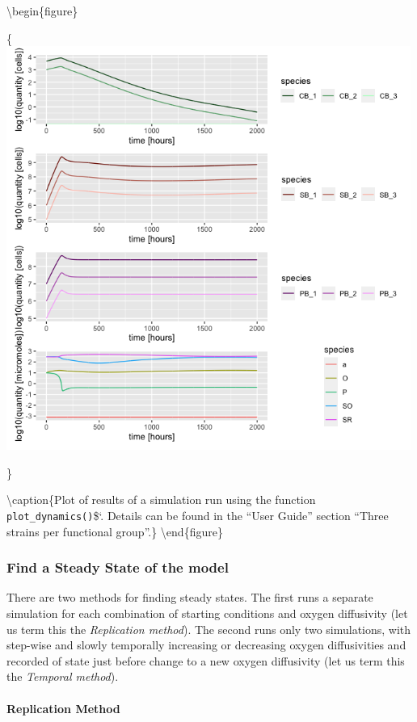 \documentclass[
]{article}
\begin{document}
\textbackslash begin\{figure\}

\{\centering \includegraphics[width=500px]{figures/fig1_plot_dynamics}

\}

\textbackslash caption\{Plot of results of a simulation run using the function \texttt{plot\_dynamics()}\$`. Details can be found in the ``User Guide'' section ``Three strains per functional group''.\}\label{fig:plot-dynamics}
\textbackslash end\{figure\}

\hypertarget{find-a-steady-state-of-the-model}{%
\subsubsection{Find a Steady State of the model}\label{find-a-steady-state-of-the-model}}

There are two methods for finding steady states. The first runs a separate simulation for each combination of starting conditions and oxygen diffusivity (let us term this the \emph{Replication method}). The second runs only two simulations, with step-wise and slowly temporally increasing or decreasing oxygen diffusivities and recorded of state just before change to a new oxygen diffusivity (let us term this the \emph{Temporal method}).

\hypertarget{replication-method}{%
\paragraph{Replication Method}\label{replication-method}}
\end{document}
